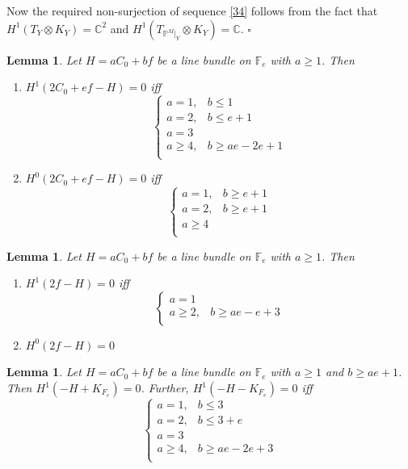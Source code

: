 \documentclass[11pt,twoside]{amsart}
\theoremstyle{plain}
\numberwithin{equation}{section}
\newtheorem{lemma}[theorem]{Lemma}
\theoremstyle{definition}
\newcommand*{\QEDB}{\hfill\ensuremath{\square}}
\begin{document}
Now the required non-surjection of sequence \ref{34} follows from the fact that $H^1(T_Y \otimes K_Y) = \mathbb{C}^2$ and $H^1(T_{\mathbb{P}^M|_Y} \otimes K_Y) = \mathbb{C}$. \QEDB




\begin{lemma}\label{2C_0+ef-H}
Let $H = aC_0+bf$ be a line bundle on $\mathbb{F}_e$ with $a \geq 1$. Then 
\begin{enumerate}
    \item[(1)] $H^1(2C_0+ef-H) = 0$ iff 
\[
\begin{cases}
   a = 1, & b \leq 1  \\
   a = 2, & b \leq e+1 \\
   a = 3 & \\
   a \geq 4, & b \geq ae-2e+1 \\
\end{cases}
\]

\item[(2)] $H^0(2C_0+ef-H) = 0$ iff 
\[
\begin{cases}
   a = 1, & b \geq e+1  \\
   a = 2, & b \geq e+1 \\
   a \geq 4 & \\
\end{cases}
\] 

\end{enumerate}

    
\end{lemma}

\begin{lemma}\label{2f-H}
Let $H = aC_0+bf$ be a line bundle on $\mathbb{F}_e$ with $a \geq 1$. Then 
\begin{enumerate}
    \item[(1)] $H^1(2f-H) = 0$ iff 
\[
\begin{cases}
   a = 1 &   \\
   a \geq 2, & b \geq ae-e+3 \\
   
\end{cases}
\]

\item[(2)] $H^0(2f-H) = 0$ 



\end{enumerate}  

\end{lemma}


\begin{lemma}\label{-H-K_Y}
Let $H = aC_0+bf$ be a line bundle on $\mathbb{F}_e$ with $a \geq 1$ and $b \geq ae+1$. Then $H^1(-H+K_{F_e}) = 0$. Further, $H^1(-H-K_{F_e}) = 0$ iff 
 \[
\begin{cases}
   a = 1, & b \leq 3  \\
   a = 2, & b \leq 3+e \\
   a = 3 & \\
   a \geq 4, & b \geq ae-2e+3 \\
\end{cases}
 \]

\end{lemma}
\end{document}
